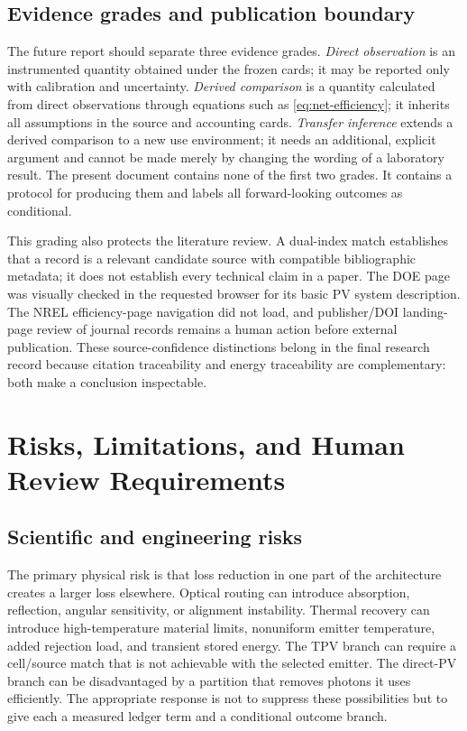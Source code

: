 \documentclass[conference]{../../../../Conference-LaTeX-template_10-17-19/IEEEtran}
\begin{document}
\subsection{Evidence grades and publication boundary}
The future report should separate three evidence grades. \emph{Direct observation} is an instrumented quantity obtained under the frozen cards; it may be reported only with calibration and uncertainty. \emph{Derived comparison} is a quantity calculated from direct observations through equations such as \eqref{eq:net-efficiency}; it inherits all assumptions in the source and accounting cards. \emph{Transfer inference} extends a derived comparison to a new use environment; it needs an additional, explicit argument and cannot be made merely by changing the wording of a laboratory result. The present document contains none of the first two grades. It contains a protocol for producing them and labels all forward-looking outcomes as conditional.

This grading also protects the literature review. A dual-index match establishes that a record is a relevant candidate source with compatible bibliographic metadata; it does not establish every technical claim in a paper. The DOE page was visually checked in the requested browser for its basic PV system description. The NREL efficiency-page navigation did not load, and publisher/DOI landing-page review of journal records remains a human action before external publication. These source-confidence distinctions belong in the final research record because citation traceability and energy traceability are complementary: both make a conclusion inspectable.

\section{Risks, Limitations, and Human Review Requirements}
\subsection{Scientific and engineering risks}
The primary physical risk is that loss reduction in one part of the architecture creates a larger loss elsewhere. Optical routing can introduce absorption, reflection, angular sensitivity, or alignment instability. Thermal recovery can introduce high-temperature material limits, nonuniform emitter temperature, added rejection load, and transient stored energy. The TPV branch can require a cell/source match that is not achievable with the selected emitter. The direct-PV branch can be disadvantaged by a partition that removes photons it uses efficiently. The appropriate response is not to suppress these possibilities but to give each a measured ledger term and a conditional outcome branch.
\end{document}
